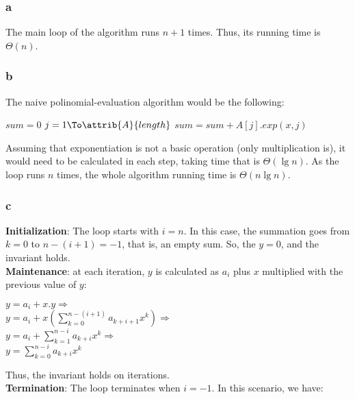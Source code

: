\documentclass[8pt,a4paper]{article}
\begin{document}
\subsubsection*{a}

The main loop of the algorithm runs $n + 1$ times. Thus, its running time
is $\Theta(n)$.

\subsubsection*{b}

The naive polinomial-evaluation algorithm would be the following:

\begin{codebox}
  \li $sum = 0$
  \li \For $j = 1 \To \attrib{A}{length}$
        \Do
  \li     $sum = sum + A[j] . exp(x, j)$
        \End
\end{codebox}

Assuming that exponentiation is not a basic operation (only multiplication is),
it would need to be calculated in each step, taking time that is $\Theta(\lg n)$.
As the loop runs $n$ times, the whole algorithm running time is $\Theta(n \lg n)$.

\subsubsection*{c}

\textbf{Initialization}: The loop starts with $i = n$. In this case, the summation
goes from $k = 0$ to $n - (i + 1) = -1$, that is, an empty sum. So, the $y = 0$,
and the invariant holds. \\

\textbf{Maintenance}: at each iteration, $y$ is calculated as $a_i$ plus $x$
multiplied with the previous value of $y$:

\begin{center}
  $y = a_i + x . y \Rightarrow$ \\
  $y = a_i + x (\sum\limits_{k = 0}^{n-(i+1)} a_{k+i+1} x^k) \Rightarrow$ \\
  $y = a_i + \sum\limits_{k = 1}^{n - i} a_{k+i} x^k \Rightarrow$ \\
  $y = \sum\limits_{k = 0}^{n-i} a_{k+i} x^k$
\end{center}

Thus, the invariant holds on iterations. \\

\textbf{Termination}: The loop terminates when $i = -1$. In this scenario, we have:
\end{document}

